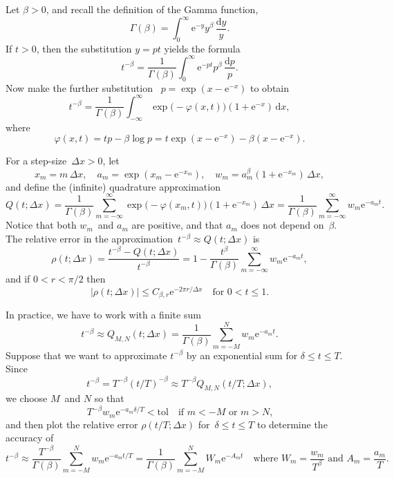 \documentclass[a4paper,12pt]{article}
\newcommand{\ud}{\mathrm{d}}
\newcommand{\ue}{\mathrm{e}}
\begin{document}
Let $\beta>0$, and recall the definition of the Gamma function,
\[
\Gamma(\beta)=\int_0^\infty\ue^{-y}y^\beta\,\frac{\ud y}{y}.
\]
If $t>0$, then the substitution $y=pt$ yields the formula
\[
t^{-\beta}=\frac{1}{\Gamma(\beta)}\int_0^\infty
    \ue^{-pt}p^\beta\,\frac{\ud p}{p}.
\]
Now make the further substitution~\cite{McLean2018} $p=\exp(x-\ue^{-x})$ to
obtain
\[
t^{-\beta}=\frac{1}{\Gamma(\beta)}\int_{-\infty}^\infty
    \exp\bigl(-\varphi(x, t)\bigr)(1+\ue^{-x})\,\ud x,
\]
where
\[
\varphi(x,t)=tp-\beta\log p=t\exp(x-\ue^{-x})-\beta(x-\ue^{-x}).
\]

For a step-size~$\Delta x>0$, let
\[
x_m=m\,\Delta x,\quad
a_m=\exp(x_m-\ue^{-x_m}),\quad
w_m=a_m^\beta(1+\ue^{-x_m})\,\Delta x,
\]
and define the (infinite) quadrature approximation
\[
Q(t;\Delta x)=\frac{1}{\Gamma(\beta)}\sum_{m=-\infty}^\infty
    \exp\bigl(-\varphi(x_m, t)\bigr)(1+\ue^{-x_m})\,\Delta x
=\frac{1}{\Gamma(\beta)}\sum_{m=-\infty}^\infty w_m\ue^{-a_mt}.
\]
Notice that both $w_m$~and $a_m$ are positive, and that $a_m$ does not depend
on~$\beta$. The relative error in the
approximation~$t^{-\beta}\approx Q(t;\Delta x)$ is
\[
\rho(t;\Delta x)=\frac{t^{-\beta}-Q(t;\Delta x)}{t^{-\beta}}
=1-\frac{t^\beta}{\Gamma(\beta)}\sum_{m=-\infty}^\infty w_m\ue^{-a_mt},
\]
and if $0<r<\pi/2$ then~\cite[Theorem~4]{McLean2018}
\begin{equation}\label{eq: relative error}
|\rho(t;\Delta x)|\le C_{\beta,r}\ue^{-2\pi r/\Delta x}
    \quad\text{for $0<t\le 1$.}
\end{equation}

In practice, we have to work with a finite sum
\[
t^{-\beta}\approx
Q_{M,N}(t;\Delta x)=\frac{1}{\Gamma(\beta)}\sum_{m=-M}^Nw_m\ue^{-a_mt}.
\]
Suppose that we want to approximate $t^{-\beta}$ by an exponential sum for
$\delta\le t\le T$.  Since
\[
t^{-\beta}=T^{-\beta}(t/T)^{-\beta}\approx T^{-\beta}Q_{M,N}(t/T; \Delta x),
\]
we choose $M$~and $N$ so that
\[
T^{-\beta}w_m\ue^{-a_m\delta/T}<\mathrm{tol}\quad\text{if $m<-M$ or $m>N$,}
\]
and then plot the relative error $\rho(t/T; \Delta x)$ for~$\delta\le t\le T$
to determine the accuracy of
\[
t^{-\beta}\approx \frac{T^{-\beta}}{\Gamma(\beta)}\sum_{m=-M}^N
    w_m\ue^{-a_mt/T}=\frac{1}{\Gamma(\beta)}\sum_{m=-M}^N W_m\ue^{-A_mt}
\quad\text{where $W_m=\frac{w_m}{T^\beta}$ and $A_m=\frac{a_m}{T}$.}
\]
\end{document}

